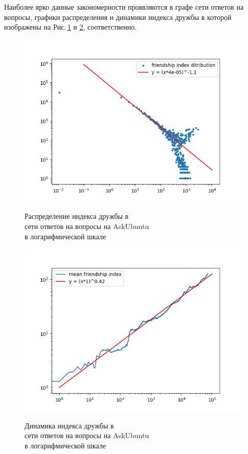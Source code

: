 \documentclass[bachelor, och, diploma]{SCWorks}
\begin{document}
Наиболее ярко данные закономерности проявляются в графе сети ответов на вопросы, графики распределения и динамики индекса дружбы в которой изображены на Рис.\,\ref{fig:auaqs} и \ref{fig:auaqd}, соответственно.

\begin{figure}[!ht]
\centering
\includegraphics[scale=0.7]{diploma_results/static_real_log/sx-askubuntu-a2q.png}\\
\caption{Распределение индекса дружбы  в\\ сети ответов на вопросы на AskUbuntu\\ в логарифмической шкале}\label{fig:auaqs}
\end{figure}

\begin{figure}[!ht]
\centering
\includegraphics[scale=0.7]{diploma_results/dynamic_real_log/sx-askubuntu-a2q_mean.png}\\
\caption{Динамика индекса дружбы  в\\ сети ответов на вопросы на AskUbuntu\\ в логарифмической шкале}\label{fig:auaqd}
\end{figure}
\end{document}
